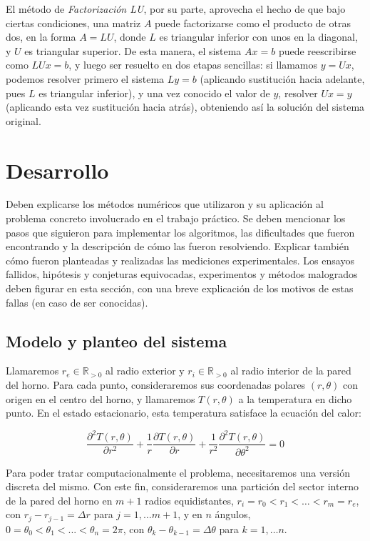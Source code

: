 \documentclass[11pt, a4paper, spanish]{article}
\theoremstyle{plain}
\theoremstyle{remark}
\begin{document}
  El método de \emph{Factorización LU}, por su parte, aprovecha el hecho de que bajo ciertas condiciones, una matriz $A$ puede factorizarse como el producto de otras dos, en la forma $A = LU$, donde $L$ es triangular inferior con unos en la diagonal, y $U$ es triangular superior. De esta manera, el sistema $Ax=b$ puede reescribirse como $LUx=b$, y luego ser resuelto en dos etapas sencillas: si llamamos $y=Ux$, podemos resolver primero el sistema $Ly=b$ (aplicando sustitución hacia adelante, pues $L$ es triangular inferior), y una vez conocido el valor de $y$, resolver $Ux=y$ (aplicando esta vez sustitución hacia atrás), obteniendo así la solución del sistema original.

\section{Desarrollo}

  {\color{Gray} Deben explicarse los métodos numéricos que utilizaron y su aplicación al problema concreto involucrado en el trabajo práctico. Se deben mencionar los pasos que siguieron para implementar los algoritmos, las dificultades que fueron encontrando y la descripción de cómo las fueron resolviendo. Explicar también cómo fueron planteadas y realizadas las mediciones experimentales. Los ensayos fallidos, hipótesis y conjeturas equivocadas, experimentos y métodos malogrados deben figurar en esta sección, con una breve explicación de los motivos de estas fallas (en caso de ser conocidas).}

  \subsection{Modelo y planteo del sistema}

    Llamaremos $r_e \in \mathbb{R}_{>0}$ al radio exterior y $r_i \in \mathbb{R}_{>0}$ al radio interior de la pared del horno. Para cada punto, consideraremos sus coordenadas polares $(r, \theta)$ con origen en el centro del horno, y llamaremos $T(r, \theta)$ a la temperatura en dicho punto. En el estado estacionario, esta temperatura satisface la ecuación del calor:

    \begin{equation} \label{des:eq1}
      \frac{\partial^2 T(r, \theta)}{\partial r^2} + \frac{1}{r} \frac{\partial T(r, \theta)}{\partial r} + \frac{1}{r^2} \frac{\partial^2 T(r, \theta)}{\partial \theta^2} = 0
    \end{equation}

    Para poder tratar computacionalmente el problema, necesitaremos una versión discreta del mismo. Con este fin, consideraremos una partición del sector interno de la pared del horno en $m + 1$ radios equidistantes, $r_i = r_0 < r_1 < \dots < r_m = r_e$, con $r_j - r_{j-1} = \Delta r$ para $j = 1, \dots m+1$, y en $n$ ángulos, $0 = \theta_0 < \theta_1 < ... < \theta_n = 2\pi$, con $\theta_k - \theta_{k-1} = \Delta \theta$ para $k = 1, \dots n$.
\end{document}
